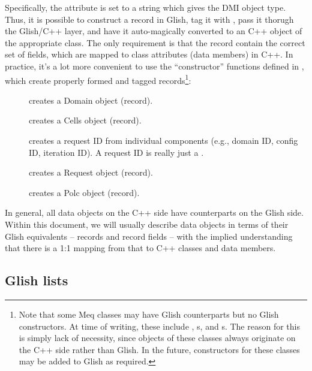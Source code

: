   Specifically, the  attribute is set to a string which
  gives the DMI object type. Thus, it is possible to construct a record in
  Glish, tag it with , pass it thorugh the Glish/C++
  layer, and have it auto-magically converted to an C++ object of the
  appropriate class. The only requirement is that the record contain the
  correct set of fields, which are mapped to class attributes (data members) in
  C++. In practice, it's a lot more convenient to use the ``constructor''
  functions defined in , which create properly formed and
  tagged records\footnote{Note that some Meq classes may have Glish
  counterparts but no Glish constructors. At time of writing, these include
  \Vells, \VellSet{}s, and \Result{}s. The reason for this is simply lack of
  necessity, since objects of these classes always originate on the C++ side
  rather than Glish. In the future, constructors for these classes may be added
  to Glish as required.}:

  \begin{description}
  
  \item[] creates a Domain object (record).

  \item[] creates a Cells object (record).

  \item[] creates a request ID from individual components
  (e.g., domain ID, config ID, iteration ID). A request ID is really just a
  .

  \item[] creates a Request object (record).
  
  \item[] creates a Polc object (record).
  
  \end{description}
  
  In general, all data objects on the C++ side have counterparts on the Glish
  side. Within this document, we will usually describe data objects in terms of
  their Glish equivalents -- records and record fields -- with the implied
  understanding that there is a 1:1 mapping from that to C++ classes and data
  members.

\subsection{Glish lists}

